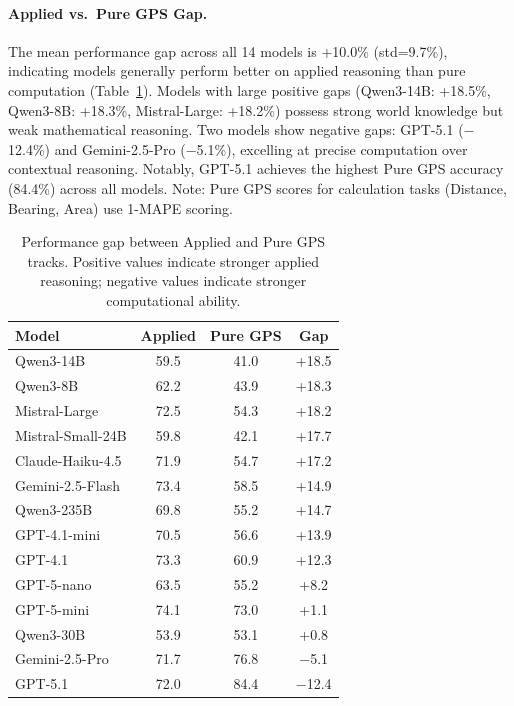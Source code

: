 \paragraph{Applied vs.\ Pure GPS Gap.}
The mean performance gap across all 14 models is +10.0\% (std=9.7\%), indicating models generally perform better on applied reasoning than pure computation (Table~\ref{tab:track_gap}). Models with large positive gaps (Qwen3-14B: +18.5\%, Qwen3-8B: +18.3\%, Mistral-Large: +18.2\%) possess strong world knowledge but weak mathematical reasoning. Two models show negative gaps: GPT-5.1 ($-$12.4\%) and Gemini-2.5-Pro ($-$5.1\%), excelling at precise computation over contextual reasoning. Notably, GPT-5.1 achieves the highest Pure GPS accuracy (84.4\%) across all models. Note: Pure GPS scores for calculation tasks (Distance, Bearing, Area) use 1-MAPE scoring.

\begin{table}[htbp]
\centering
\caption{Performance gap between Applied and Pure GPS tracks. Positive values indicate stronger applied reasoning; negative values indicate stronger computational ability.}
\label{tab:track_gap}
\small
\begin{tabular}{lccc}
\toprule
\textbf{Model} & \textbf{Applied} & \textbf{Pure GPS} & \textbf{Gap} \\
\midrule
Qwen3-14B & 59.5 & 41.0 & +18.5 \\
Qwen3-8B & 62.2 & 43.9 & +18.3 \\
Mistral-Large & 72.5 & 54.3 & +18.2 \\
Mistral-Small-24B & 59.8 & 42.1 & +17.7 \\
Claude-Haiku-4.5 & 71.9 & 54.7 & +17.2 \\
Gemini-2.5-Flash & 73.4 & 58.5 & +14.9 \\
Qwen3-235B & 69.8 & 55.2 & +14.7 \\
GPT-4.1-mini & 70.5 & 56.6 & +13.9 \\
GPT-4.1 & 73.3 & 60.9 & +12.3 \\
GPT-5-nano & 63.5 & 55.2 & +8.2 \\
GPT-5-mini & 74.1 & 73.0 & +1.1 \\
Qwen3-30B & 53.9 & 53.1 & +0.8 \\
Gemini-2.5-Pro & 71.7 & 76.8 & $-$5.1 \\
GPT-5.1 & 72.0 & 84.4 & $-$12.4 \\
\bottomrule
\end{tabular}
\end{table}

